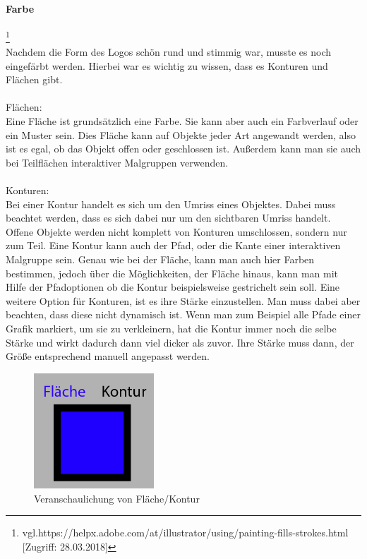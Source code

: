 \paragraph{Farbe}
\footnote{\label{} vgl.https://helpx.adobe.com/at/illustrator/using/painting-fills-strokes.html [Zugriff: 28.03.2018]}
\leavevmode \\
Nachdem die Form des Logos schön rund und stimmig war, musste es noch eingefärbt werden. Hierbei war es wichtig zu wissen, dass es Konturen und Flächen gibt.
\leavevmode \\
\leavevmode \\
Flächen:
\leavevmode \\
Eine Fläche ist grundsätzlich eine Farbe. Sie kann aber auch ein Farbverlauf oder ein Muster sein. Dies Fläche kann auf Objekte jeder Art angewandt werden, also ist es egal, ob das Objekt offen oder geschlossen ist. Außerdem kann man sie auch bei Teilflächen interaktiver Malgruppen verwenden.
\leavevmode \\
\leavevmode \\
Konturen:
\leavevmode \\
Bei einer Kontur handelt es sich um den Umriss eines Objektes. Dabei muss beachtet werden, dass es sich dabei nur um den sichtbaren Umriss handelt. Offene Objekte werden nicht komplett von Konturen umschlossen, sondern nur zum Teil. Eine Kontur kann auch der Pfad, oder die Kante einer interaktiven Malgruppe sein. Genau wie bei der Fläche, kann man auch hier Farben bestimmen, jedoch über die Möglichkeiten, der Fläche hinaus, kann man mit Hilfe der Pfadoptionen ob die Kontur beispielsweise gestrichelt sein soll. Eine weitere Option für Konturen, ist es ihre Stärke einzustellen. Man muss dabei aber beachten, dass diese nicht dynamisch ist. Wenn man zum Beispiel alle Pfade einer Grafik markiert, um sie zu verkleinern, hat die Kontur immer noch die selbe Stärke und wirkt dadurch dann viel dicker als zuvor. Ihre Stärke muss dann, der Größe entsprechend manuell angepasst werden.

\begin{figure}[H] 
  \centering
     \includegraphics[width=0.4\textwidth]{design_abb4.png}
  \caption{Veranschaulichung von Fläche/Kontur}
\end{figure}

